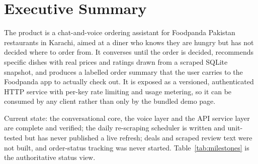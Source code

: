 \documentclass[11pt,a4paper]{article}
\begin{document}
\section{Executive Summary}

The product is a chat-and-voice ordering assistant for Foodpanda Pakistan
restaurants in Karachi, aimed at a diner who knows they are hungry but has not
decided where to order from. It converses until the order is decided,
recommends specific dishes with real prices and ratings drawn from a scraped
SQLite snapshot, and produces a labelled order summary that the user carries
to the Foodpanda app to actually check out. It is exposed as a versioned,
authenticated HTTP service with per-key rate limiting and usage metering, so
it can be consumed by any client rather than only by the bundled demo page.

Current state: the conversational core, the voice layer and the API service
layer are complete and verified; the daily re-scraping scheduler is written
and unit-tested but has never published a live refresh; deals and scraped
review text were not built, and order-status tracking was never started.
Table~\ref{tab:milestones} is the authoritative status view.
\end{document}
